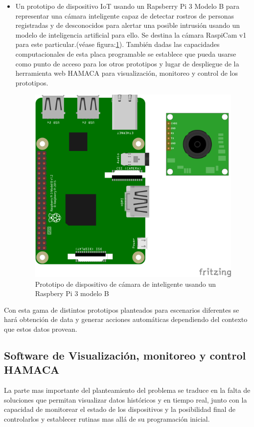 \begin{itemize}
\item Un prototipo de dispositivo IoT usando un Rapsberry Pi 3 Modelo B para representar una cámara inteligente capaz de detectar rostros de personas registradas y de desconocidos para alertar una posible intrusión usando un modelo de inteligencia artificial para ello. Se destina la cámara RaspiCam v1 para este particular.(véase figura:\ref{fig:rpipeter}). También dadas las capacidades computacionales de esta placa programable se establece que pueda usarse como punto de acceso para los otros prototipos y lugar de despliegue de la herramienta web HAMACA para visualización, monitoreo y control de los prototipos. 
\begin{figure}[htb]
\centering
\includegraphics[scale=0.6]{./Figuras/rpipeter.png}
\caption{Prototipo de dispositivo de cámara de inteligente usando un Raspbery Pi 3 modelo B}
\label{fig:rpipeter}
\vspace*{-10pt}
\end{figure}

\end{itemize}

Con esta gama de distintos prototipos planteados para escenarios diferentes se hará obtención de data y generar acciones automáticas dependiendo del contexto que estos datos provean.  

\subsection{Software de Visualización, monitoreo y control HAMACA}
La parte mas importante del planteamiento del problema se traduce en la falta de soluciones que permitan visualizar datos históricos y en tiempo real, junto con la capacidad de monitorear el estado de los dispositivos y la posibilidad final de controlarlos y establecer rutinas mas allá de su programación inicial.\\

